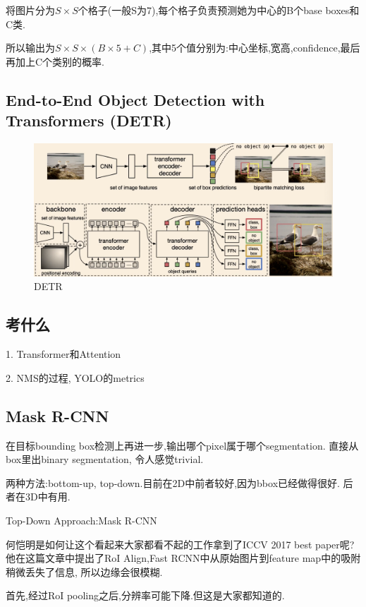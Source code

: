 将图片分为$S\times S$个格子(一般S为7),每个格子负责预测她为中心的B个base boxes和C类.

所以输出为$S\times S\times (B\times 5+C)$,其中5个值分别为:中心坐标,宽高,confidence,最后再加上C个类别的概率.

\subsection{End-to-End Object Detection with Transformers (DETR)}

\begin{figure}[htbp]
    \centering
    \includegraphics[scale=0.2]{figures/DETR.png}
    \caption{DETR}
    \label{fig:DETR}
\end{figure}



\subsection{考什么}

1. Transformer和Attention

2. NMS的过程, YOLO的metrics

\subsection{Mask R-CNN}

在目标bounding box检测上再进一步,输出哪个pixel属于哪个segmentation.
直接从box里出binary segmentation, 令人感觉trivial.

两种方法:bottom-up, top-down.目前在2D中前者较好,因为bbox已经做得很好.
后者在3D中有用.

Top-Down Approach:Mask R-CNN

何恺明是如何让这个看起来大家都看不起的工作拿到了ICCV 2017 best paper呢?
他在这篇文章中提出了RoI Align,Fast RCNN中从原始图片到feature map中的吸附
稍微丢失了信息, 所以边缘会很模糊.

首先,经过RoI pooling之后,分辨率可能下降.但这是大家都知道的.

